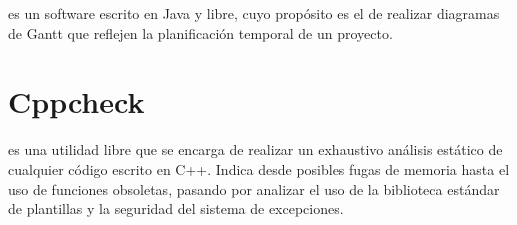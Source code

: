  es un software escrito en Java y libre, cuyo propósito es el de realizar diagramas de Gantt que reflejen la planificación temporal de un proyecto.

\section*{Cppcheck}

 es una utilidad libre que se encarga de realizar un exhaustivo análisis estático de cualquier código escrito en C++. Indica desde posibles fugas de memoria hasta el uso de funciones obsoletas, pasando por analizar el uso de la biblioteca estándar de plantillas y la seguridad del sistema de excepciones.


